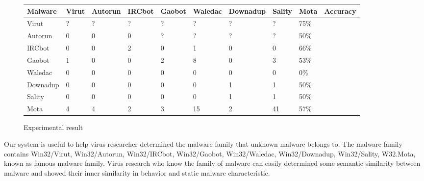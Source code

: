 \begin{figure}[h!]
  \begin{center}
    \begin{tabular}{ | l | l | l | l | l | l | l | l | l | l |}
     \hline
    Malware & Virut & Autorun & IRCbot & Gaobot & Waledac & Downadup & Sality & Mota & Accuracy\\ \hline
    Virut & ? & ? & ? & ? & ? & ? & ? & 75\% \\ \hline
	Autorun & 0 & 0 & 0 & ? & ? & ? & ? & 50\% \\ \hline
	IRCbot & 0 & 0 & 2 & 0 & 1 & 0 & 0 & 66\% \\ \hline
	Gaobot & 1 & 0 & 0 & 2 & 8 & 0 & 3 & 53\% \\ \hline
	Waledac & 0 & 0 & 0 & 0 & 0 & 0 & 0 & 0\% \\ \hline
	Downadup & 0 & 0 & 0 & 0 & 0 & 1 & 1 & 50\% \\ \hline
	Sality & 0 & 0 & 0 & 0 & 0 & 1 & 1 & 50\% \\ \hline
	Mota & 4 & 4 & 2 & 3 & 15 & 2 & 41 & 57\% \\ \hline

    \end{tabular}
	\end{center}
     \caption{Experimental result}
    \label{fig:experimentalresult}
\end{figure} 

Our system is useful to help virus researcher determined the malware family that unknown malware belongs to. The malware family contains Win32/Virut, Win32/Autorun, Win32/IRCbot, Win32/Gaobot, Win32/Waledac, Win32/Downadup, Win32/Sality, W32.Mota, known as famous malware family. Virus research who know the family of malware can easily determined some semantic similarity between malware and showed their inner similarity in behavior and static malware characteristic.

